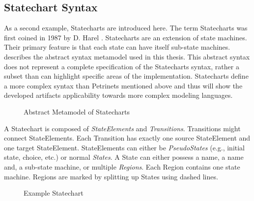 \subsection{Statechart Syntax}
\label{sec:statecharts}
As a second example, Statecharts are introduced here. The term Statecharts was first coined in 1987 by D. Harel \cite{harel_statecharts_1987}. Statecharts are an extension of state machines. Their primary feature is that each state can have itself sub-state machines.  describes the abstract syntax metamodel used in this thesis. This abstract syntax does not represent a complete specification of the Statecharts syntax, rather a subset than can highlight specific areas of the implementation. Statecharts define a more complex syntax than Petrinets mentioned above and thus will show the developed artifacts applicability towards more complex modeling languages.

\begin{figure}
\centering

\caption{Abstract Metamodel of Statecharts}
\label{fig:statechartmm}
\end{figure}


A Statechart is composed of \emph{StateElements} and \emph{Transitions}. Transitions might connect StateElements. Each Transition has exactly one source StateElement and one target StateElement. StateElements can either be \emph{PseudoStates} (e.g., initial state, choice, etc.) or normal \emph{States}. A State can either possess a name, a name and, a sub-state machine, or multiple \emph{Regions}. Each Region contains one state machine. Regions are marked by splitting up States using dashed lines. 


\begin{figure}
\centering

\caption{Example Statechart}
\label{fig:state-example}
\end{figure}




